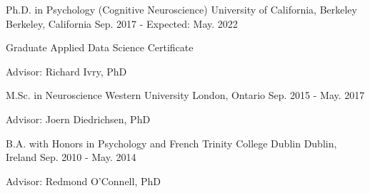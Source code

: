 

\begin{cventries}

  \cventry
    {Ph.D. in Psychology (Cognitive Neuroscience)} %
    {University of California, Berkeley} %
    {Berkeley, California} %
    {Sep. 2017 - Expected: May. 2022} %
    {
      \begin{cvitems} %
      	\item {Graduate Applied Data Science Certificate}
        \item {Advisor: Richard Ivry, PhD}
      \end{cvitems}
    }
    
  \cventry
    {M.Sc. in Neuroscience} %
    {Western University} %
    {London, Ontario} %
    {Sep. 2015 - May. 2017} %
    {
      \begin{cvitems} %
        \item {Advisor: Joern Diedrichsen, PhD}
      \end{cvitems}
    }
    
  \cventry
    {B.A. with Honors in Psychology and French} %
    {Trinity College Dublin} %
    {Dublin, Ireland} %
    {Sep. 2010 - May. 2014} %
    {
      \begin{cvitems} %
        \item {Advisor: Redmond O'Connell, PhD}
      \end{cvitems}
    }

\end{cventries}

